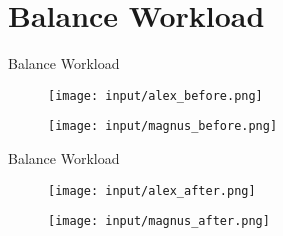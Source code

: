 \section*{Balance Workload}
\begin{frame}{Balance Workload}
\begin{figure}[H]
	\centering
		\texttt{[image: input/alex\_before.png]}
	\label{fig:alex_before}
\end{figure}

\begin{figure}[H]
	\centering
		\texttt{[image: input/magnus\_before.png]}
	\label{fig:magnus_before}
\end{figure}
\end{frame}

\begin{frame}{Balance Workload}
\begin{figure}[H]
	\centering
		\texttt{[image: input/alex\_after.png]}
	\label{fig:alex_after}
\end{figure}

\begin{figure}[H]
	\centering
		\texttt{[image: input/magnus\_after.png]}
	\label{fig:magnus_after}
\end{figure}
\end{frame}